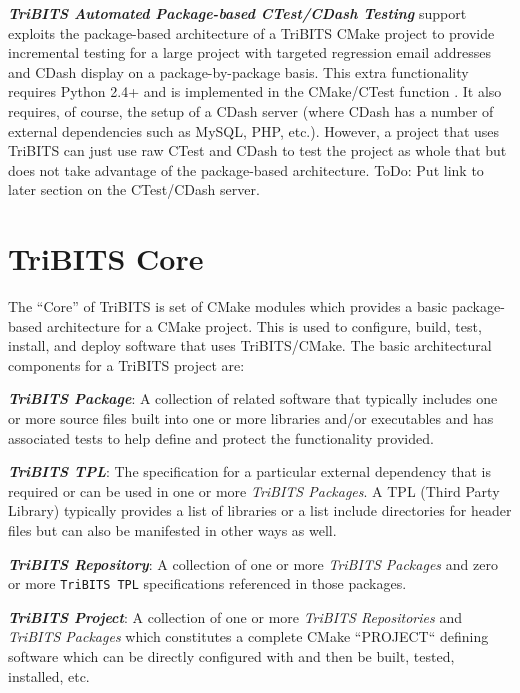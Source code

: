 \documentclass[note]{TechNote}
\begin{document}
\textbf{\textit{TriBITS Automated Package-based CTest/CDash Testing}} support exploits the package-based architecture of a TriBITS CMake project to provide incremental testing for a large project with targeted regression email addresses and CDash display on a package-by-package basis.   This extra functionality requires Python 2.4+ and is implemented in the CMake/CTest function . It also requires, of course, the setup of a CDash server (where CDash has a number of external dependencies such as MySQL, PHP, etc.).  However, a project that uses TriBITS can just use raw CTest and CDash to test the project as whole that but does not take advantage of the package-based architecture.  ToDo: Put link to later section on the CTest/CDash server.

%
\section{TriBITS Core}
\label{sec:tribits_core}
%

The ``Core'' of TriBITS is set of CMake modules which provides a basic package-based architecture for a CMake project.  This is used to configure, build, test, install, and deploy software that uses TriBITS/CMake.  The basic architectural components for a TriBITS project are:

\begin{compactitem}

\item\textbf{\textit{TriBITS Package}}: A collection of related software that typically includes one or more source files built into one or more libraries and/or executables and has associated tests to help define and protect the functionality provided.

\item\textbf{\textit{TriBITS TPL}}: The specification for a particular external dependency that is required or can be used in one or more \textit{TriBITS Packages}.  A TPL (Third Party Library) typically provides a list of libraries or a list include directories for header files but can also be manifested in other ways as well.

\item\textbf{\textit{TriBITS Repository}}: A collection of one or more \textit{TriBITS Packages} and zero or more \texttt{TriBITS TPL} specifications referenced in those packages.

\item\textbf{\textit{TriBITS Project}}: A collection of one or more \textit{TriBITS Repositories} and \textit{TriBITS Packages} which constitutes a complete CMake ``PROJECT`` defining software which can be directly configured with  and then be built, tested, installed,  etc.

\end{compactitem}
\end{document}
